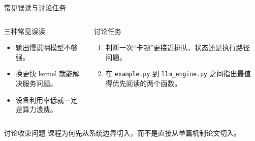 \begin{frame}{常见误读与讨论任务}
  \begin{columns}[T,totalwidth=\textwidth]
    \begin{block}{三种常见误读}
      \begin{itemize}
        \item 输出慢说明模型不够强。
        \item 换更快 kernel 就能解决服务问题。
        \item 设备利用率低就一定是算力浪费。
      \end{itemize}
    \end{block}
    \begin{block}{讨论任务}
      \begin{enumerate}
        \item 判断一次“卡顿”更接近排队、状态还是执行路径问题。
        \item 在 \texttt{example.py} 到 \texttt{llm\_engine.py} 之间指出最值得优先阅读的两个函数。
      \end{enumerate}
    \end{block}
  \end{columns}
  \vspace{0.4em}
  \begin{block}{讨论收束问题}
    课程为何先从系统边界切入，而不是直接从单篇机制论文切入。
  \end{block}
\end{frame}
